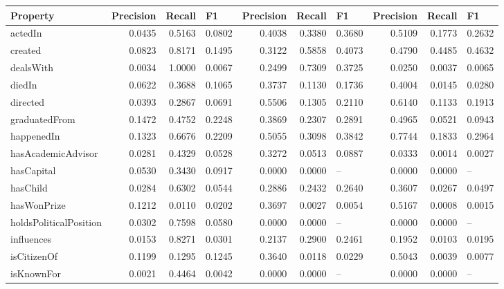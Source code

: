 \begin{table}[htbp]
\centering
\scriptsize
\begin{tabular}{|l|r|r|r|r|r|r|r|r|r|}
\hline
Property & \multicolumn{1}{l|}{Precision} & \multicolumn{1}{l|}{Recall} & \multicolumn{1}{l|}{F1} & \multicolumn{1}{l|}{Precision} & \multicolumn{1}{l|}{Recall} & \multicolumn{1}{l|}{F1} & \multicolumn{1}{l|}{Precision} & \multicolumn{1}{l|}{Recall} & \multicolumn{1}{l|}{F1} \\ \hline
actedIn & 0.0435 & 0.5163 & 0.0802 & 0.4038 & 0.3380 & 0.3680 & 0.5109 & 0.1773 & 0.2632 \\ \hline
created & 0.0823 & 0.8171 & 0.1495 & 0.3122 & 0.5858 & 0.4073 & 0.4790 & 0.4485 & 0.4632 \\ \hline
dealsWith & 0.0034 & 1.0000 & 0.0067 & 0.2499 & 0.7309 & 0.3725 & 0.0250 & 0.0037 & 0.0065 \\ \hline
diedIn & 0.0622 & 0.3688 & 0.1065 & 0.3737 & 0.1130 & 0.1736 & 0.4004 & 0.0145 & 0.0280 \\ \hline
directed & 0.0393 & 0.2867 & 0.0691 & 0.5506 & 0.1305 & 0.2110 & 0.6140 & 0.1133 & 0.1913 \\ \hline
graduatedFrom & 0.1472 & 0.4752 & 0.2248 & 0.3869 & 0.2307 & 0.2891 & 0.4965 & 0.0521 & 0.0943 \\ \hline
happenedIn & 0.1323 & 0.6676 & 0.2209 & 0.5055 & 0.3098 & 0.3842 & 0.7744 & 0.1833 & 0.2964 \\ \hline
hasAcademicAdvisor & 0.0281 & 0.4329 & 0.0528 & 0.3272 & 0.0513 & 0.0887 & 0.0333 & 0.0014 & 0.0027 \\ \hline
hasCapital & 0.0530 & 0.3430 & 0.0917 & 0.0000 & 0.0000 & \multicolumn{1}{l|}{--} & 0.0000 & 0.0000 & \multicolumn{1}{l|}{--} \\ \hline
hasChild & 0.0284 & 0.6302 & 0.0544 & 0.2886 & 0.2432 & 0.2640 & 0.3607 & 0.0267 & 0.0497 \\ \hline
hasWonPrize & 0.1212 & 0.0110 & 0.0202 & 0.3697 & 0.0027 & 0.0054 & 0.5167 & 0.0008 & 0.0015 \\ \hline
holdsPoliticalPosition & 0.0302 & 0.7598 & 0.0580 & 0.0000 & 0.0000 & \multicolumn{1}{l|}{--} & 0.0000 & 0.0000 & \multicolumn{1}{l|}{--} \\ \hline
influences & 0.0153 & 0.8271 & 0.0301 & 0.2137 & 0.2900 & 0.2461 & 0.1952 & 0.0103 & 0.0195 \\ \hline
isCitizenOf & 0.1199 & 0.1295 & 0.1245 & 0.3640 & 0.0118 & 0.0229 & 0.5043 & 0.0039 & 0.0077 \\ \hline
isKnownFor & 0.0021 & 0.4464 & 0.0042 & 0.0000 & 0.0000 & \multicolumn{1}{l|}{--} & 0.0000 & 0.0000 & \multicolumn{1}{l|}{--} \\ \hline

\end{tabular}
\end{table}
